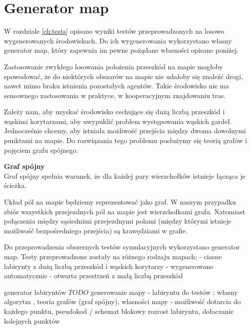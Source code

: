 \section{Generator map}

W rozdziale \ref{ch:tests} opisano wyniki testów przeprowadzonych na losowo wygenerowanych środowiskach.
Do ich wygenerowania wykorzystano własny generator map, który zapewnia im pewne pożądane własności opisane poniżej.

Zastosowanie zwykłego losowania położenia przeszkód na mapie mogłoby spowodować, że do niektórych obszarów na mapie nie udałoby się znaleźć drogi, nawet mimo braku istnienia pozostałych agentów. Takie środowisko nie ma sensownego zastosowania w praktyce, w kooperacyjnym znajdowaniu tras.

Zależy nam, aby uzyskać środowisko cechujące się dużą liczbą przeszkód i wąskimi korytarzami, aby uwypuklić problem występowania wąskich gardeł. Jednocześnie chcemy, aby istniała możliwość przejścia między dwoma dowolnymi punktami na mapie.
Do rozwiązania tego problemu posłużymy się teorią grafów i pojęciem grafu spójnego.

\begin{definition}{\bf Graf spójny\\}
	Graf spójny spełnia warunek, że dla każdej pary wierzchołków istnieje łącząca je ścieżka.
\end{definition}

Układ pól na mapie będziemy reprezentować jako graf.
W naszym przypadku zbiór wszystkich przejezdnych pól na mapie jest wierzchołkami grafu. Natomiast połączenia między sąsiednimi przejezdnymi polami (między którymi istnieje możliwość bezpośredniego przejścia) są krawędziami w grafie.



Do przeprowadzenia obszernych testów symulacyjnych wykorzystano generator map. 
Testy przeprowadzone zostały na różnego rodzaju mapach:
 - ciasne labirynty z dużą liczbą przeszkód i wąskich korytarzy - wygenerowane automatycznie
 - otwarta przestrzeń z małą liczbą przeszkód

generator labiryntów
$TODO$ generowanie mapy - labiryntu do testów : własny algorytm , teoria grafów (graf spójny), wlasności mapy - możliwość dotarcia do każdego punktu, pseudokod / schemat blokowy
rozrost labiryntu, dołaczanie kolejnych punktów


